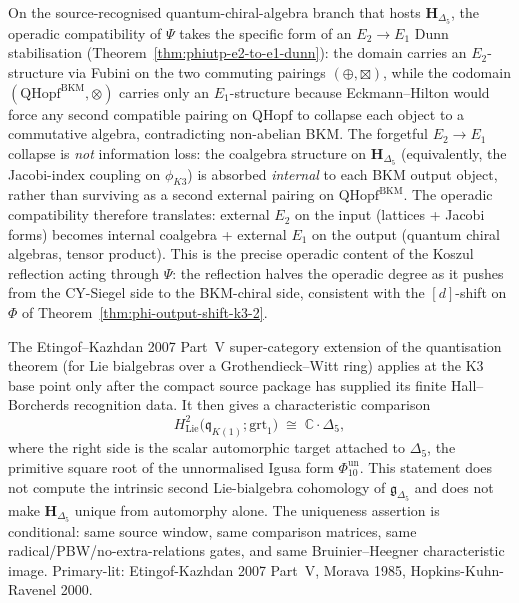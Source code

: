 \begin{remark}
\label{rem:qca-psi-dunn-stabilisation-hd5}
On the source-recognised quantum-chiral-algebra branch that hosts
$\mathbf H_{\Delta_5}$, the operadic compatibility of $\Psi$ takes the
specific form of an $E_2 \to E_1$ Dunn stabilisation
(Theorem~\ref{thm:phiutp-e2-to-e1-dunn}):
the domain carries an $E_2$-structure via Fubini on the two commuting
pairings $(\oplus, \boxtimes)$, while the codomain
$(\mathrm{QHopf}^{\mathrm{BKM}}, \otimes)$ carries only an
$E_1$-structure because Eckmann--Hilton would force any second
compatible pairing on $\mathrm{QHopf}$ to collapse each object to a
commutative algebra, contradicting non-abelian BKM. The forgetful
$E_2 \to E_1$ collapse is \emph{not} information loss: the coalgebra
structure on $\mathbf H_{\Delta_5}$ (equivalently, the Jacobi-index
coupling on $\phi_{K3}$) is absorbed \emph{internal} to each BKM output
object, rather than surviving as a second external pairing on
$\mathrm{QHopf}^{\mathrm{BKM}}$. The operadic compatibility therefore
translates: external $E_2$ on the input (lattices + Jacobi forms) becomes
internal coalgebra + external $E_1$ on the output (quantum chiral
algebras, tensor product). This is the precise operadic content of the
Koszul reflection acting through $\Psi$: the reflection halves the
operadic degree as it pushes from the CY-Siegel side to the BKM-chiral
side, consistent with the $[d]$-shift on $\Phi$ of
Theorem~\ref{thm:phi-output-shift-k3-2}.
\end{remark}

\begin{remark}
\label{rem:qca-2}
The Etingof--Kazhdan 2007 Part~V super-category extension of the
quantisation theorem (for Lie bialgebras over a Grothendieck--Witt
ring) applies at the K3 base point only after the compact source package
has supplied its finite Hall--Borcherds recognition data. It then gives
a characteristic comparison
\[
H^2_{\mathrm{Lie}}\bigl(\mathfrak q_{K(1)};\mathrm{grt}_1\bigr)
\;\cong\; \mathbb C\cdot \Delta_5,
\]
where the right side is the scalar automorphic target attached to
$\Delta_5$, the primitive square root of the unnormalised Igusa form
$\Phi_{10}^{\mathrm{un}}$. This statement does not compute
the intrinsic second Lie-bialgebra cohomology of
$\mathfrak g_{\Delta_5}$ and does not make $\mathbf H_{\Delta_5}$
unique from automorphy alone. The uniqueness
assertion is conditional: same source window, same comparison matrices,
same radical/PBW/no-extra-relations gates, and same
Bruinier--Heegner characteristic image. Primary-lit:
Etingof-Kazhdan 2007 Part~V, Morava 1985, Hopkins-Kuhn-Ravenel 2000.
\end{remark}


